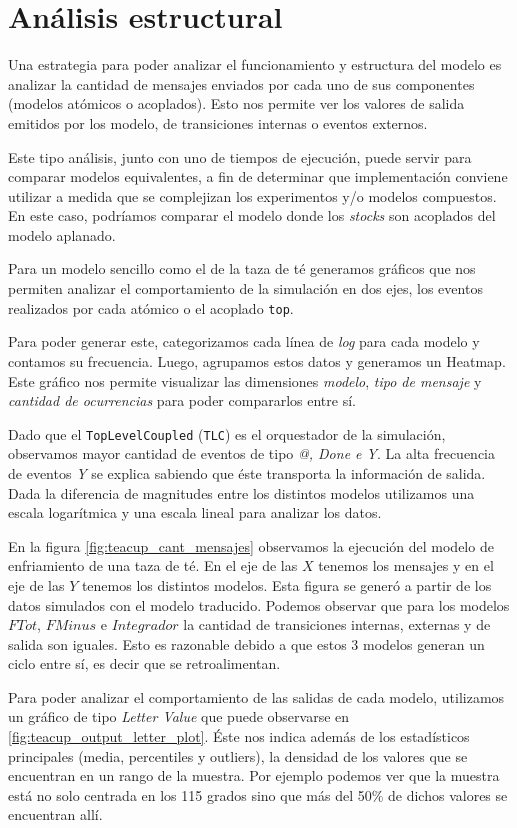\section{Análisis estructural}
Una estrategia para poder analizar el funcionamiento y estructura del modelo es analizar la
cantidad de mensajes enviados por cada uno de sus componentes (modelos atómicos o acoplados). 
Esto nos permite ver los valores de salida emitidos por los modelo, de transiciones internas o eventos
externos.

Este tipo análisis, junto con uno de tiempos de ejecución, puede servir para comparar modelos equivalentes, a fin de determinar que implementación conviene utilizar a medida que se complejizan los experimentos y/o modelos compuestos. En este caso, podríamos comparar el modelo donde los \textit{stocks} son acoplados del modelo aplanado.

Para un modelo sencillo como el de la taza de té generamos gráficos que nos
permiten analizar el comportamiento de la simulación en dos ejes, los eventos
realizados por cada atómico o el acoplado \texttt{top}.

Para poder generar este, categorizamos cada línea de \textit{log} para cada modelo y
contamos su frecuencia. Luego, agrupamos estos datos y generamos un Heatmap.
Este gráfico nos permite visualizar las dimensiones \textit{modelo}, \textit{tipo de mensaje} y
\textit{cantidad de ocurrencias} para poder compararlos entre sí.

Dado que el \texttt{TopLevelCoupled} (\texttt{TLC})  es el orquestador de la simulación,
observamos mayor cantidad de eventos de tipo \textit{@, Done e Y}. La alta
frecuencia de eventos \textit{Y} se explica sabiendo que éste  transporta la
información de salida. Dada la diferencia de magnitudes entre los distintos
modelos utilizamos una escala logarítmica y una escala lineal para analizar los
datos.

En la figura \ref{fig:teacup_cant_mensajes} observamos la  ejecución del modelo
de enfriamiento de una taza de té. En el eje de las $X$ tenemos los mensajes 
y en el eje de las $Y$ tenemos los distintos modelos. 
Esta figura se generó a partir de los datos simulados con el modelo traducido.
Podemos observar que para los modelos $FTot$, $FMinus$ e $Integrador$ la cantidad 
de transiciones internas, externas y de salida son iguales. Esto es razonable 
debido a que estos 3 modelos generan un ciclo entre sí, es decir que se retroalimentan.

Para poder analizar el comportamiento de las salidas de cada modelo, utilizamos
un gráfico de tipo \textit{Letter Value} que puede observarse en \ref{fig:teacup_output_letter_plot}.
Éste nos indica además de los estadísticos principales (media, percentiles y outliers), 
la densidad de los valores que se encuentran en un rango de la muestra. 
Por ejemplo podemos ver que la muestra está no solo centrada en los 115 grados sino que 
más del 50\% de dichos valores se encuentran allí. 

